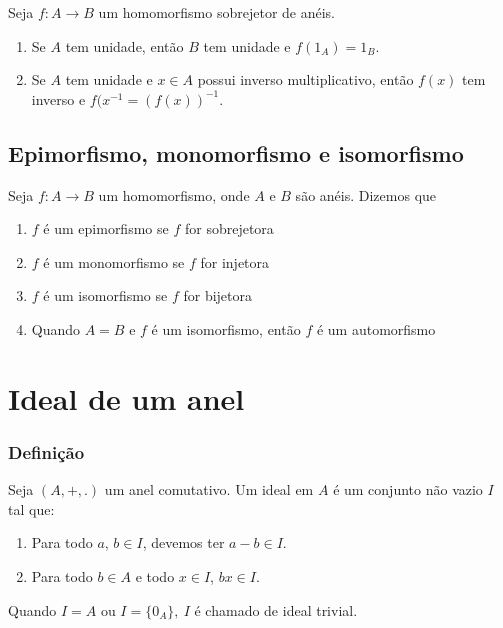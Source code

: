 \begin{proposicao}
	Seja $f : A \to B$ um homomorfismo sobrejetor de an\'eis.
	\begin{enumerate}
		\item Se $A$ tem unidade, ent\~ao $B$ tem unidade e $f(1_A) = 1_B$.
		\item Se $A$ tem unidade e $x \in A$ possui inverso multiplicativo, ent\~ao $f(x)$ tem inverso e $f(x^{-1} = (f(x))^{-1}$.
	\end{enumerate}
\end{proposicao}

\subsection{Epimorfismo, monomorfismo e isomorfismo}
\begin{definicao} Seja $f:A\rightarrow B$ um homomorfismo, onde $A$ e $B$ s{\~a}o an{\'e}is. Dizemos que
\begin{enumerate}
\item $f$ {\'e} um epimorfismo se $f$ for sobrejetora
\item $f$ {\'e} um monomorfismo se $f$ for injetora
\item $f$ {\'e} um isomorfismo se $f$ for bijetora
\item Quando $A=B$ e $f$ {\'e} um isomorfismo, ent{\~a}o $f$ {\'e} um automorfismo
\end{enumerate}
\end{definicao}

\section{Ideal de um anel}
\subsubsection{Defini{\c c}{\~a}o}
\begin{definicao} Seja $(A,+,.)$ um anel comutativo. Um ideal em $A$ {\'e} um conjunto n{\~a}o vazio $I$ tal que:
\begin{enumerate}
\item Para todo $a$, $b\in I$, devemos ter $a - b \in I$.
\item Para todo $b\in A$ e todo $x \in I$, $bx \in I$.
\end{enumerate}
\end{definicao}

Quando $I=A$ ou $I=\{0_{A}\},\ I$ {\'e} chamado de ideal trivial.

